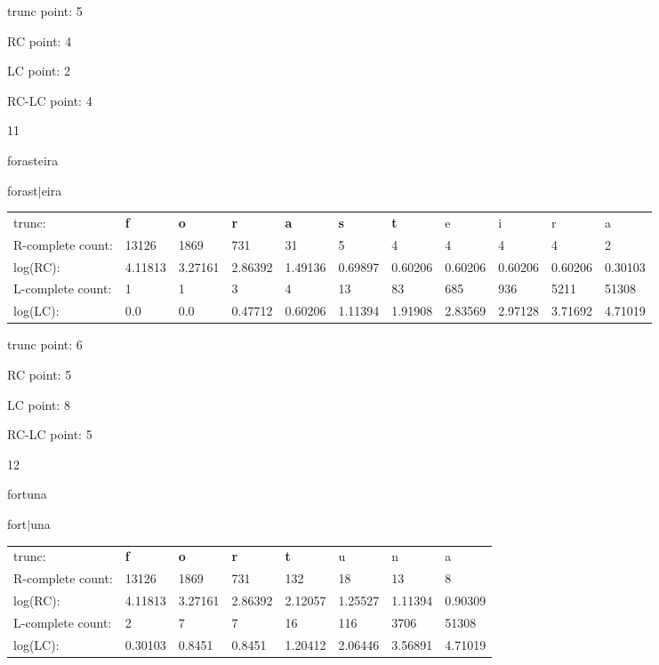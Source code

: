 \documentclass{article}
\begin{document}
trunc point: 5

RC point: 4

LC point: 2

RC-LC point: 4

\vspace{3em}



11

forasteira

forast$|$eira

\vspace{1em}

\begin{tabular}{l|llllllllll}

trunc: & {\color{red}\bf f} & {\color{red}\bf o} & {\color{red}\bf r} & {\color{red}\bf a} & {\color{red}\bf s} & {\color{red}\bf t} & e & i & r & a \\ 
R-complete count: & 13126 & 1869 & 731 & 31 & 5 & 4 & 4 & 4 & 4 & 2 \\ 
log(RC): & 4.11813 & 3.27161 & 2.86392 & 1.49136 & 0.69897 & 0.60206 & 0.60206 & 0.60206 & 0.60206 & 0.30103 \\ 
L-complete count: & 1 & 1 & 3 & 4 & 13 & 83 & 685 & 936 & 5211 & 51308 \\ 
log(LC): & 0.0 & 0.0 & 0.47712 & 0.60206 & 1.11394 & 1.91908 & 2.83569 & 2.97128 & 3.71692 & 4.71019 \\ 
\end{tabular}

trunc point: 6

RC point: 5

LC point: 8

RC-LC point: 5

\vspace{3em}



12

fortuna

fort$|$una

\vspace{1em}

\begin{tabular}{l|lllllll}

trunc: & {\color{red}\bf f} & {\color{red}\bf o} & {\color{red}\bf r} & {\color{red}\bf t} & u & n & a \\ 
R-complete count: & 13126 & 1869 & 731 & 132 & 18 & 13 & 8 \\ 
log(RC): & 4.11813 & 3.27161 & 2.86392 & 2.12057 & 1.25527 & 1.11394 & 0.90309 \\ 
L-complete count: & 2 & 7 & 7 & 16 & 116 & 3706 & 51308 \\ 
log(LC): & 0.30103 & 0.8451 & 0.8451 & 1.20412 & 2.06446 & 3.56891 & 4.71019 \\ 
\end{tabular}
\end{document}
